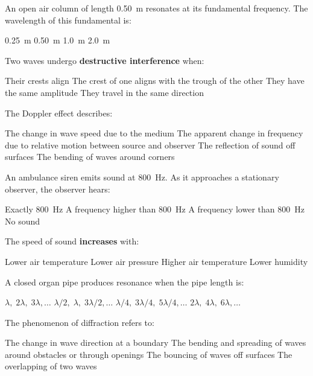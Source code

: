 \documentclass[addpoints]{exam}
\begin{document}
\begin{questions}
\question[1] An open air column of length \SI{0.50}{m} resonates at its fundamental
frequency. The wavelength of this fundamental is:
\begin{choices}
    \choice \SI{0.25}{m}
    \choice \SI{0.50}{m}
    \correctchoice \SI{1.0}{m}
    \choice \SI{2.0}{m}
\end{choices}

\question[1] Two waves undergo \textbf{destructive interference} when:
\begin{choices}
    \choice Their crests align
    \correctchoice The crest of one aligns with the trough of the other
    \choice They have the same amplitude
    \choice They travel in the same direction
\end{choices}

\question[1] The Doppler effect describes:
\begin{choices}
    \choice The change in wave speed due to the medium
    \correctchoice The apparent change in frequency due to relative motion between source and observer
    \choice The reflection of sound off surfaces
    \choice The bending of waves around corners
\end{choices}

\question[1] An ambulance siren emits sound at \SI{800}{Hz}. As it approaches a
stationary observer, the observer hears:
\begin{choices}
    \choice Exactly \SI{800}{Hz}
    \correctchoice A frequency higher than \SI{800}{Hz}
    \choice A frequency lower than \SI{800}{Hz}
    \choice No sound
\end{choices}

\question[1] The speed of sound \textbf{increases} with:
\begin{choices}
    \choice Lower air temperature
    \choice Lower air pressure
    \correctchoice Higher air temperature
    \choice Lower humidity
\end{choices}

\question[1] A closed organ pipe produces resonance when the pipe length is:
\begin{choices}
    \choice $\lambda,\; 2\lambda,\; 3\lambda,\ldots$
    \choice $\lambda/2,\; \lambda,\; 3\lambda/2,\ldots$
    \correctchoice $\lambda/4,\; 3\lambda/4,\; 5\lambda/4,\ldots$
    \choice $2\lambda,\; 4\lambda,\; 6\lambda,\ldots$
\end{choices}

\question[1] The phenomenon of diffraction refers to:
\begin{choices}
    \choice The change in wave direction at a boundary
    \correctchoice The bending and spreading of waves around obstacles or through openings
    \choice The bouncing of waves off surfaces
    \choice The overlapping of two waves
\end{choices}


\end{questions}
\end{document}
